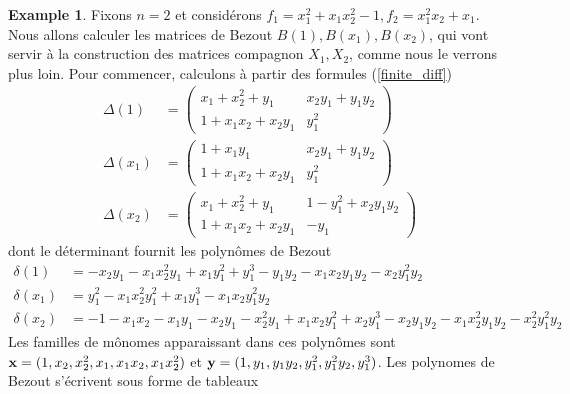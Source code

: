 \documentclass{article}
\theoremstyle{plain}%
\theoremstyle{definition}
\newtheorem{exmp}{Example}
\theoremstyle{remark}
\begin{document}
\begin{exmp}
\label{ex_bez_multi} 
Fixons $n = 2$ et considérons $f_1 = x_1^2 + x_1x_2^2 - 1, f_2 = x_1^2x_2 + x_1$.
Nous allons calculer les matrices de Bezout $B(1), B(x_1), B(x_2)$,  qui vont servir à la construction des matrices compagnon $X_1, X_2$, comme nous le verrons plus loin. Pour commencer, calculons à partir des formules (\ref{finite_diff})
\begin{align}
\Delta(1) &= 
\begin{pmatrix}
x_1 + x_2^2 + y_1 & x_2y_1 + y_1y_2 \\
1 + x_1x_2 + x_2y_1 & y_1^2
\end{pmatrix} \nonumber  \\
\Delta(x_1) &= 
\begin{pmatrix}
1 + x_1y_1 & x_2y_1 + y_1y_2 \\
1 + x_1x_2 + x_2y_1 & y_1^2
\end{pmatrix} \nonumber  \\
\Delta(x_2) &= 
\begin{pmatrix}
x_1 + x_2^2 + y_1 & 1 - y_1^2 + x_2y_1y_2 \\
1 + x_1x_2 + x_2y_1  & -y_1
\end{pmatrix} \nonumber 
\end{align}
dont le déterminant fournit les polynômes de Bezout
\begin{align}
\delta(1) &= -x_2y_1 - x_1x_2^2y_1 + x_1y_1^2 + y_1^3 - y_1y_2 - x_1x_2y_1y_2 - x_2y_1^2y_2 \nonumber \\
\delta(x_1) &=  y_1^2 - x_1x_2^2y_1^2 + x_1y_1^3 - x_1x_2y_1^2y_2 \nonumber \\
\delta(x_2) &= -1 - x_1x_2 - x_1y_1 -x_2y_1 - x_2^2y_1 + x_1x_2y_1^2 + x_2y_1^3 - x_2y_1y_2 - x_1x_2^2y_1y_2 - x_2^2y_1^2y_2\nonumber 
\end{align}
Les familles de mônomes apparaissant dans ces polynômes sont
$\bold{x} = (1, x_2, x_2^2, x_1, x_1x_2, x_1x_2^2)$ et $\bold{y} = (1, y_1, y_1y_2, y_1^2, y_1^2y_2, y_1^3)$.
Les polynomes de Bezout s'écrivent sous forme de tableaux\\


\end{exmp}
\end{document}

